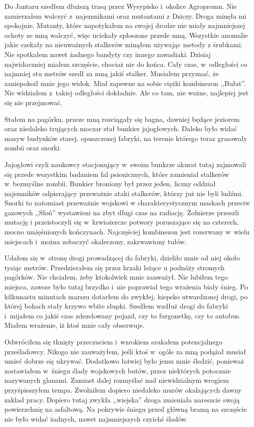 \documentclass[../MAIN.tex]{subfiles}
\begin{document}
Do Jantaru szedłem dłuższą trasą przez Wysypisko i~okolice
Agropromu. Nie zamierzałem walczyć z~najemnikami oraz mutantami
z Dziczy. Droga minęła mi spokojnie. Mutanty, które napotykałem
na swojej drodze nie miały najmniejszej ochoty ze mną walczyć,
więc uciekały spłoszone przede mną. Wszystkie anomalie jakie
czekały na nieuważnych stalkerów minąłem używając metody z
śrubkami. Nie spotkałem nawet żadnego bandyty czy innego
zawadiaki. Dzisiaj najwidoczniej miałem szczęście, chociaż nie
do końca. Cały czas, w~odległości co najmniej stu metrów szedł
za mną jakiś stalker. Musiałem przyznać, że zaniepokoił mnie
jego widok. Miał zapewne na sobie ciężki kombinezon ,,Bułat''.
Nie widziałem z~takiej odległości dokładnie. Ale co tam, nie
ważne, najlepiej jest się nie przejmować.

Stałem na pagórku, przeze mną rozciągały się bagna, dawniej
będące jeziorem oraz niedaleko trujących moczar stał bunkier
jajogłowych. Daleko było widać masyw budynków starej,
opuszczonej fabryki, na terenie którego teraz grasowały zombii
oraz snorki.

Jajogłowi czyli naukowcy stacjonujący w~swoim
bunkrze akurat tutaj zajmowali się przede wszystkim badaniem
fal psionicznych, które zamieniał stalkerów w~bezmyślne zombii.
Bunkier broniony był przez jeden, liczny oddział najemników
odpierający przeważnie ataki stalkerów, którzy już nie byli
ludźmi. Snorki to natomiast przeważnie wojskowi w
charakterystycznym maskach przeciw gazowych ,,Słoń'' wystawieni
na zbyt długi czas na radiację. Żołnierze przeszli mutację i
przeistoczyli się w~krwiożercze potwory poruszające się na
czterech, mocno umięśnionych kończynach. Najczęściej kombinezon
jest rozerwany w~wielu miejscach i~można zobaczyć okaleczony,
zakrwawiony tułów.

Udałem się w~stronę drogi prowadzącej do fabryki, dzieliło mnie
od niej około tysiąc metrów. Przedzierałem się przez krzaki
leżące u podnóży stromych pagórków. Nie chciałem, żeby
ktokolwiek mnie zauważył. Nie lubiłem tego miejsca, zawsze było
tutaj brzydko i~nie poprawiał tego wrażenia biały śnieg. Po
kilkunastu minutach marszu dotarłem do zwykłej, kiepsko
utwardzonej drogi, po której bokach stały krzywo wbite słupki.
Szedłem wzdłuż drogi do fabryki i~mijałem co jakiś czas
zdezelowany pojazd, czy to furgonetkę, czy to autobus. Miałem
wrażenie, iż ktoś mnie cały obserwuje.

Odwróciłem się tknięty
przeczuciem i~wzrokiem szukałem potencjalnego prześladowcy.
Nikogo nie zauważyłem, jeśli ktoś w~ogóle za mną podążał musiał
umieć dobrze się ukrywać. Dodatkowo łatwiej było jemu mnie
śledzić, ponieważ zostawiałem w~śniegu ślady wojskowych butów,
przez niektórych potocznie nazywanych glanami. Zamiast dalej
rozmyślać nad niewidzialnym wrogiem przyśpieszyłem tempa.
Zwolniłem dopiero niedaleko murów okalających dawny zakład
pracy. Dopiero tutaj zwykła ,,wiejska'' droga zmieniała
nareszcie
swoją powierzchnię na asfaltową. Na pokrywie śniegu przed
główną bramą na szczęście nie było widać żadnych, nawet
najmniejszych czyichś śladów.
\end{document}
